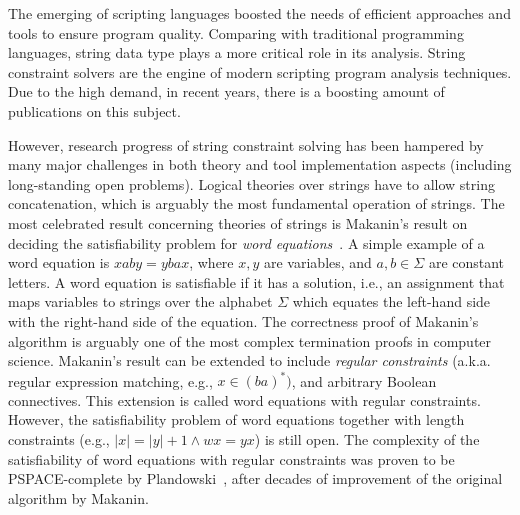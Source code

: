 
The emerging of scripting languages boosted the needs of efficient approaches and tools to ensure program quality.
Comparing with traditional programming languages, string data type plays a more critical role in its analysis.
String constraint solvers are the engine of modern scripting program analysis techniques. 
Due to the high demand, in recent years, there is a boosting amount of publications on this subject.

However, research progress of string constraint solving has been hampered by many major challenges in both theory and tool implementation aspects (including long-standing open problems). 
Logical theories over strings have to allow string concatenation, which is arguably the most fundamental operation of strings. 
The most celebrated result concerning theories of strings is Makanin’s result on deciding the satisfiability problem for \emph{word equations}~\cite{makanin77}.
A simple example of a word equation is $xaby = ybax$, where $x, y$ are variables, and $a, b \in \Sigma$ are constant letters. 
A word equation is satisfiable if it has a solution, i.e., an assignment that maps variables to strings over the alphabet $\Sigma$ which equates the left-hand side with the right-hand side of the equation.
The correctness proof of Makanin’s algorithm is arguably one of the most complex termination proofs in computer science. 
Makanin’s result can be extended to include \emph{regular constraints} (a.k.a. regular expression matching, e.g., $x \in (ba)^*)$, and arbitrary Boolean connectives.
This extension is called word equations with regular constraints. 
However, the satisfiability problem of word equations together with length constraints (e.g., $\vert x\vert =\vert y\vert +1 \wedge wx=yx$) is still open.
The complexity of the satisfiability of word equations with regular constraints was proven to be PSPACE-complete by Plandowski~\cite{plandowski99}, after decades of improvement of the original algorithm by Makanin.

